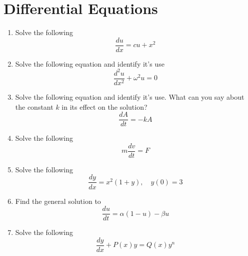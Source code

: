 \documentclass{article}
\begin{document}
\section{Differential Equations}
\begin{enumerate}[\thesection .1]
\item Solve the following
  \begin{equation*}
    \frac{du}{dx} = c u + x^2
  \end{equation*}

\item Solve the following equation and identify it's use
  \begin{equation*}
    \frac{d^2u}{dx^2} + {\omega}^2 u = 0
  \end{equation*}

\item Solve the following equation and identify it's use. What can you say about the constant $k$ in its effect on the solution?
  \begin{equation*}
    \frac{dA}{dt} = - k A
  \end{equation*}

\item Solve the following
   \begin{equation*}
    m \frac{dv}{dt} = F
  \end{equation*}

\item Solve the following
  \begin{equation*}
    \frac{dy}{dx} = x^2 (1 + y),\quad y(0) = 3
  \end{equation*}

\item Find the general solution to
  \begin{equation*}
    \frac{du}{dt} = \alpha (1 - u) - \beta u
  \end{equation*}

\item Solve the following
  \begin{equation*}
    \frac{dy}{dx} + P(x) y = Q(x) y^n
  \end{equation*}
\end{enumerate}
\end{document}
